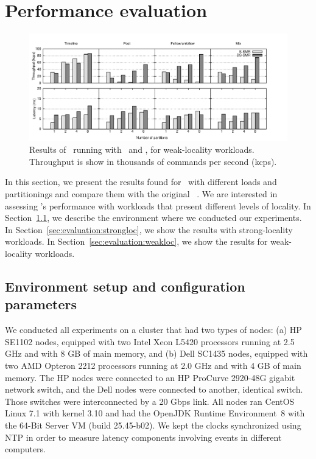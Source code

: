 \section{Performance evaluation}
\label{sec:experiments}

\begin{figure}
\begin{minipage}[b]{1\linewidth} %
\centering
      \includegraphics[draft, width=1.0\linewidth]{figures/graphs/weak-locality}
\end{minipage}
\caption{Results of \appname\ running with \ssmr\ and \dssmr{}, for weak-locality workloads. Throughput is show in thousands of commands per second (kcps).}
\label{fig:weakloc}
\end{figure}


In this section, we present the results found for \appname\ with different loads and partitionings and compare them with the original \ssmr{}~\cite{bezerra2014ssmr}.
We are interested in assessing \dssmr{}'s performance with workloads that present different levels of locality.
In Section~\ref{sec:evaluation:setup}, we describe the environment where we conducted our experiments.
In Section~\ref{sec:evaluation:strongloc}, we show the results with strong-locality workloads.
In Section~\ref{sec:evaluation:weakloc}, we show the results for weak-locality workloads.

\subsection{Environment setup and configuration parameters}
\label{sec:evaluation:setup}

We conducted all experiments on a cluster that had two types of nodes: (a) HP SE1102 nodes, equipped with two Intel Xeon L5420 processors running at 2.5 GHz and with 8 GB of main memory, and (b) Dell SC1435 nodes, equipped with two AMD Opteron 2212 processors running at 2.0 GHz and with 4 GB of main memory. The HP nodes were connected to an HP ProCurve 2920-48G gigabit network switch, and the Dell nodes were connected to another, identical switch. Those switches were interconnected by a 20 Gbps link.
All nodes ran CentOS Linux 7.1 with kernel 3.10 and had the OpenJDK Runtime Environment~8 with the \mbox{64-Bit} Server VM (build 25.45-b02).
We kept the clocks synchronized using NTP in order to measure latency components involving events in different computers.


